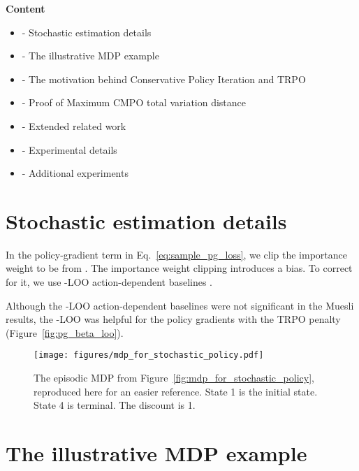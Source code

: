 \documentclass{article}
\begin{document}
\textbf{Content}
\begin{itemize}
    \setlength{\itemsep}{0pt}
\item \makebox[0.3cm][l]{\ref{sec:stochastic_details}} - Stochastic estimation details
    \item \makebox[0.3cm][l]{\ref{sec:MDP}} - The illustrative MDP example
    \item \makebox[0.3cm][l]{\ref{sec:cpi}} - The motivation behind Conservative Policy Iteration and TRPO
    \item \makebox[0.3cm][l]{\ref{sec:distance_proof}} - Proof of Maximum CMPO total variation distance
    \item \makebox[0.3cm][l]{\ref{sec:appendix_related_work}} - Extended related work
    \item \makebox[0.3cm][l]{\ref{sec:appendix_experiment_details}} - Experimental details
    \item \makebox[0.3cm][l]{\ref{sec:appendix_experiments}} - Additional experiments
\end{itemize}


\section{Stochastic estimation details}
\label{sec:stochastic_details}
In the policy-gradient term in Eq.~\ref{eq:sample_pg_loss}, we clip the importance weight  to be from . The importance weight clipping introduces a bias. To correct for it, we use -LOO action-dependent baselines \citep{gruslys2018reactor}.

Although the -LOO action-dependent baselines were not significant in the Muesli results, the -LOO was helpful for the policy gradients with the TRPO penalty (Figure~\ref{fig:pg_beta_loo}).


\begin{figure}[thb]
\vskip 0.2in
\begin{center}
\centerline{\texttt{[image: figures/mdp\_for\_stochastic\_policy.pdf]}}
\caption{The episodic MDP from Figure~\ref{fig:mdp_for_stochastic_policy}, reproduced here for an easier reference. State 1 is the initial state. State 4 is terminal.
The discount is 1.
}
\label{fig:appendix_mdp_for_stochastic_policy}
\end{center}
\vskip -0.35in
\end{figure}

\section{The illustrative MDP example}
\label{sec:MDP}
\end{document}
